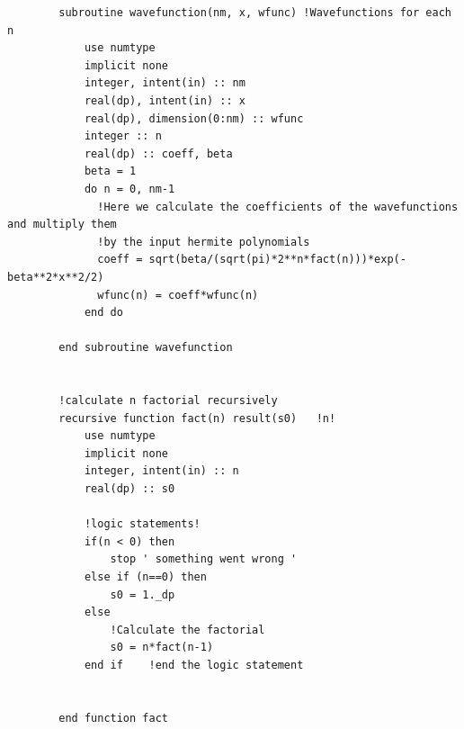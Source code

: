 \documentclass[12pt]{article}
\begin{document}
\begin{enumerate}
\begin{verbatim}
        subroutine wavefunction(nm, x, wfunc) !Wavefunctions for each n
            use numtype
            implicit none
            integer, intent(in) :: nm
            real(dp), intent(in) :: x
            real(dp), dimension(0:nm) :: wfunc
            integer :: n
            real(dp) :: coeff, beta
            beta = 1
            do n = 0, nm-1
              !Here we calculate the coefficients of the wavefunctions and multiply them
              !by the input hermite polynomials
              coeff = sqrt(beta/(sqrt(pi)*2**n*fact(n)))*exp(-beta**2*x**2/2)
              wfunc(n) = coeff*wfunc(n)
            end do

        end subroutine wavefunction


        !calculate n factorial recursively
        recursive function fact(n) result(s0)   !n!
            use numtype
            implicit none
            integer, intent(in) :: n
            real(dp) :: s0

            !logic statements!
            if(n < 0) then 
                stop ' something went wrong '
            else if (n==0) then
                s0 = 1._dp
            else 
                !Calculate the factorial
                s0 = n*fact(n-1)
            end if    !end the logic statement

    
        end function fact


\end{verbatim}
\end{enumerate}
\end{document}
